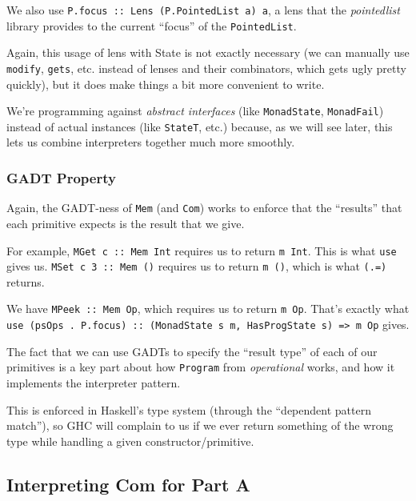 \documentclass[]{article}
\begin{document}
We also use \texttt{P.focus\ ::\ Lens\textquotesingle{}\ (P.PointedList\ a)\ a},
a lens that the \emph{pointedlist} library provides to the current ``focus'' of
the \texttt{PointedList}.

Again, this usage of lens with State is not exactly necessary (we can manually
use \texttt{modify}, \texttt{gets}, etc. instead of lenses and their
combinators, which gets ugly pretty quickly), but it does make things a bit more
convenient to write.

We're programming against \emph{abstract interfaces} (like \texttt{MonadState},
\texttt{MonadFail}) instead of actual instances (like \texttt{StateT}, etc.)
because, as we will see later, this lets us combine interpreters together much
more smoothly.

\subsubsection{GADT Property}\label{gadt-property}

Again, the GADT-ness of \texttt{Mem} (and \texttt{Com}) works to enforce that
the ``results'' that each primitive expects is the result that we give.

For example, \texttt{MGet\ \textquotesingle{}c\textquotesingle{}\ ::\ Mem\ Int}
requires us to return \texttt{m\ Int}. This is what \texttt{use} gives us.
\texttt{MSet\ \textquotesingle{}c\textquotesingle{}\ 3\ ::\ Mem\ ()} requires us
to return \texttt{m\ ()}, which is what \texttt{(.=)} returns.

We have \texttt{MPeek\ ::\ Mem\ Op}, which requires us to return \texttt{m\ Op}.
That's exactly what
\texttt{use\ (psOps\ .\ P.focus)\ ::\ (MonadState\ s\ m,\ HasProgState\ s)\ =\textgreater{}\ m\ Op}
gives.

The fact that we can use GADTs to specify the ``result type'' of each of our
primitives is a key part about how \texttt{Program} from \emph{operational}
works, and how it implements the interpreter pattern.

This is enforced in Haskell's type system (through the ``dependent pattern
match''), so GHC will complain to us if we ever return something of the wrong
type while handling a given constructor/primitive.

\subsection{Interpreting Com for Part A}\label{interpreting-com-for-part-a}
\end{document}

